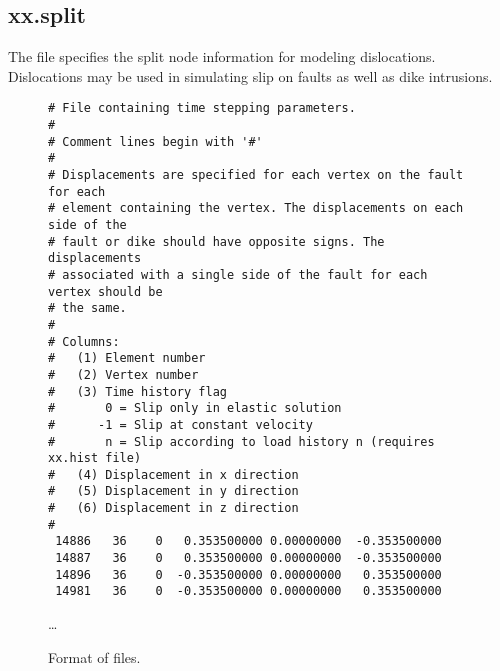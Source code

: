 \subsection{xx.split}

The  file specifies the split node information for
modeling dislocations. Dislocations may be used in simulating slip on
faults as well as dike intrusions.

\begin{figure}
  \begin{center}
\begin{verbatim}
# File containing time stepping parameters.
#
# Comment lines begin with '#'
#
# Displacements are specified for each vertex on the fault for each
# element containing the vertex. The displacements on each side of the
# fault or dike should have opposite signs. The displacements
# associated with a single side of the fault for each vertex should be
# the same.
#
# Columns:
#   (1) Element number
#   (2) Vertex number
#   (3) Time history flag
#       0 = Slip only in elastic solution
#      -1 = Slip at constant velocity
#       n = Slip according to load history n (requires xx.hist file)
#   (4) Displacement in x direction
#   (5) Displacement in y direction
#   (6) Displacement in z direction
#
 14886   36    0   0.353500000 0.00000000  -0.353500000
 14887   36    0   0.353500000 0.00000000  -0.353500000
 14896   36    0  -0.353500000 0.00000000   0.353500000
 14981   36    0  -0.353500000 0.00000000   0.353500000
\end{verbatim}
    \ldots
    \caption{Format of  files.}
  \end{center}
\end{figure}
